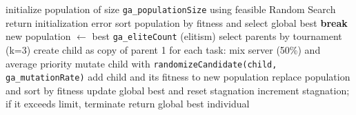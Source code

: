 \begin{algorithm}[H]
\caption{Genetic Algorithm}
\begin{algorithmic}[1]
\State initialize population of size \texttt{ga\_populationSize} using feasible Random Search
	\State return initialization error
\EndIf
\State sort population by fitness and select global best
	 \State \textbf{break} \EndIf
	\State new population $\gets$ best \texttt{ga\_eliteCount} (elitism)
		\State select parents by tournament (k=3)
		\State create child as copy of parent 1
			\State for each task: mix server (50\%) and average priority
		\EndIf
		\State mutate child with \texttt{randomizeCandidate(child, ga\_mutationRate)}
			\State add child and its fitness to new population
		\EndIf
	\EndWhile
	\State replace population and sort by fitness
		\State update global best and reset stagnation
	\Else
		\State increment stagnation; if it exceeds limit, terminate
	\EndIf
\EndFor
\State return global best individual
\end{algorithmic}
\end{algorithm}